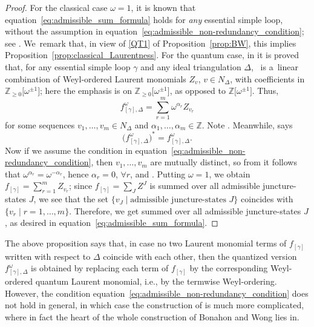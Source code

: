 \documentclass[10pt,a4paper]{amsart}
\numberwithin{equation}{section}
\theoremstyle{definition}
\begin{document}
\begin{proof}
For the classical case $\omega=1$, it is known that equation~\eqref{eq:admissible_sum_formula} holds for {\it any} essential simple loop, without the assumption in equation~\eqref{eq:admissible_non-redundancy_condition}; see \cite[Lemma~4, and Section~6 with $\omega=1$]{BW}. We~remark that, in view of \ref{QT1} of Proposition~\ref{prop:BW}, this implies Proposition~\ref{prop:classical_Laurentness}. For the quantum case, in \cite{CKKO} it is proved that, for any essential simple loop $\gamma$ and any ideal triangulation $\Delta$, ~is a~linear combination of Weyl-ordered Laurent monomials $Z_v$, $v\in N_\Delta$, with coefficients in $\mathbb{Z}_{\ge 0}\bigl[\omega^{\pm 1}\bigr]$; here the emphasis is on $\mathbb{Z}_{\ge 0}\bigl[\omega^{\pm 1}\bigr]$, as opposed to $\mathbb{Z}\bigl[\omega^{\pm 1}\bigr]$. Thus,
\[
f^\omega_{[\gamma],\Delta} = \sum_{r=1}^m \omega^{\alpha_r} Z_{v_r}
\]
 for some sequences $v_1,\dots,v_m \in N_\Delta$ and $\alpha_1,\dots,\alpha_m \in \mathbb{Z}$. Note . Meanwhile, \cite[Lemma~2.30]{AK} says
\[
\bigl(f^\omega_{[\gamma],\Delta}\bigr)^* = f^\omega_{[\gamma],\Delta}.
\]
Now if we assume the condition in equation~\eqref{eq:admissible_non-redundancy_condition}, then $v_1,\dots,v_m$ are mutually distinct, so from  it follows that $\omega^{\alpha_r} = \omega^{-\alpha_r}$, hence $\alpha_r=0$, $\forall r$, and . Putting $\omega=1$, we obtain $f_{[\gamma]} = \sum_{r=1}^m Z_{v_r}$; since $f_{[\gamma]} = \sum_J Z^J$ is summed over all admissible juncture-states $J$, we see that the set $\{v_J \mid \mbox{admissible juncture-states $J$}\}$ coincides with $\{ v_r \mid r=1,\dots,m\}$. Therefore, we get  summed over all admissible juncture-states $J$, as desired in equation~\eqref{eq:admissible_sum_formula}.
\end{proof}
The above proposition says that, in case no two Laurent monomial terms of $f_{[\gamma]}$ written with respect to $\Delta$ coincide with each other, then the quantized version $f^\omega_{[\gamma],\Delta}$ is obtained by replacing each term of $f_{[\gamma]}$ by the corresponding Weyl-ordered quantum Laurent monomial, i.e., by the termwise Weyl-ordering. However, the condition equation~\eqref{eq:admissible_non-redundancy_condition} does not hold in general, in which case the construction of  is much more complicated, where in fact the heart of the whole construction of Bonahon and Wong \cite{BW} lies in.
\end{document}
